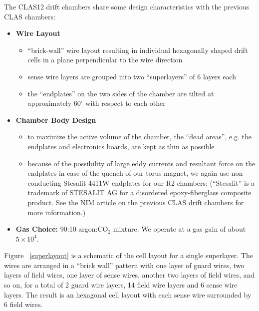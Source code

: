 The CLAS12 drift chambers share some design characteristics with the previous CLAS chambers:
\begin{itemize}
\item {\bf Wire Layout}
\begin{itemize}
\item ``brick-wall'' wire layout resulting in individual hexagonally shaped
drift cells in a plane perpendicular to the wire direction
\item sense wire layers are grouped into two ``superlayers'' of 6 layers each
\item the ``endplates'' on the two sides of the chamber are tilted 
at approximately 60$^\circ$ with respect to each other
\end{itemize}
\item {\bf Chamber Body Design}
\begin{itemize}
\item to maximize the active volume of the chamber, the ``dead areas'', e.g.
the endplates and electronics boards, are kept as thin as possible
\item because of the possibility of large eddy currents and resultant
force on the endplates in case of the quench of our torus magnet, we again
use non-conducting Stesalit 4411W endplates for our R2 chambers; (``Stesalit'' is 
a trademark of STESALIT AG for a disordered epoxy-fiberglass composite product.  See
the NIM article \cite{dcnim} on the previous CLAS drift chambers for more information.)
\end{itemize}
\item {\bf Gas Choice:} 90:10 argon:CO$_2$ mixture.  We operate at a gas gain of 
about $5 \times 10^4$.
\end{itemize}

Figure ~\ref{superlayout} is a schematic of the cell layout for a single superlayer.
The wires are arranged in a ``brick wall'' pattern with one layer of guard wires,
two layers of field wires, one layer of sense wires, another two layers of field
wires, and so on, for a total of 2 guard wire layers, 14 field wire layers and
6 sense wire layers.  The result is an hexagonal cell layout with each sense wire
surrounded by 6 field wires.

